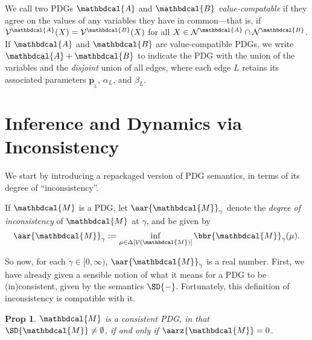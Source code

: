 \documentclass{article}
\theoremstyle{plain}
\newtheorem{prop}[theorem]{Prop}
\theoremstyle{definition}
\theoremstyle{remark}
\let\H\relax
\DeclareMathOperator{\H}{\mathrm{H}} %
\newcommand\mat[1]{\mathbf{#1}}
\newcommand{\thickD}{I\mkern-8muD}
\newcommand{\kldiv}{\thickD\infdivx}
\newcommand{\bp}[1][L]{\mat{p}_{\!_{#1}\!}}
\newcommand{\V}{\mathcal V}
\newcommand{\N}{\mathcal N}
\newcommand{\dg}[1]{\mathbdcal{#1}}
\newcommand{\bundle}{\mathbin{+}}
\newcommand{\ed}[3]{%
		\mathchoice%
		{#2\overset{\smash{\mskip-5mu\raisebox{-3pt}{${#1}$}}}{\xrightarrow{\hphantom{\scriptstyle {#1}}}} #3} %
		{#2\overset{\smash{\mskip-5mu\raisebox{-3pt}{$\scriptstyle {#1}$}}}{\xrightarrow{\hphantom{\scriptstyle {#1}}}} #3}%
		{#2\overset{\smash{\mskip-5mu\raisebox{-3pt}{$\scriptscriptstyle {#1}$}}}{\xrightarrow{\hphantom{\scriptscriptstyle {#1}}}} #3} %
		{#2\overset{\smash{\mskip-5mu\raisebox{-3pt}{$\scriptscriptstyle {#1}$}}}{\xrightarrow{\hphantom{\scriptscriptstyle {#1}}}} #3}} %
\newcommand{\alle}[1][L]{_{\ed {#1}XY}}
\begin{document}
We call two PDGs $\dg A$ and $\dg B$ \emph{value-compatable} if they agree
on the values of any variables they have in common---that is, if
$\V^{\dg A}(X) = \V^{\dg B}(X)$ for all $X \in \N^{\dg A} \cap \N^{\dg B}$.
%
If $\dg A$ and $\dg B$ are value-compatible PDGs, we write $\dg A \bundle \dg B$ to indicate the PDG with the union of the variables and the \emph{disjoint} union of all edges, where each edge $L$ retains its associated parameters $\bp$, $\alpha_L$, and $\beta_L$.

\section{Inference and Dynamics via Inconsistency}
We start by introducing a repackaged version of PDG semantics,
in terms of its degree of ``inconsistency''.

\begin{defn}
	If $\dg M$ is a PDG, let $\aar{\dg M}_\gamma$ denote the \emph{degree of
	inconsistency} of $\dg M$ at $\gamma$, and be given by
	$$ \aar{\dg M}_\gamma := \inf_{\mu \in \Delta[\V(\dg M)]}
		\bbr{\dg M}_\gamma(\mu)
		.
	$$
\end{defn}

So now, for each $\gamma \in [0, \infty)$, $\aar{\dg M}_\gamma$ is a real number.
First, we have already given a sensible notion of what it means
for a PDG to be (in)consistent, given by the semantics $\SD{-}$. Fortunately,
this definition of inconsistency is compatible with it.

\begin{prop}
	$\dg M$ is a \emph{consistent} PDG, in that $\SD{\dg M} \ne \emptyset$,
	if and only if $\aarz{\dg M} = 0$.
\end{prop}

\end{document}
